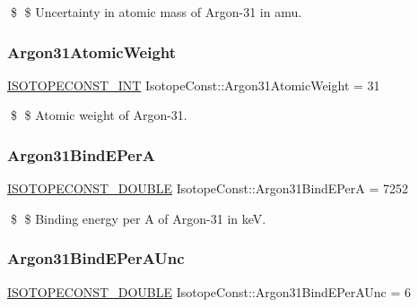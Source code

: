 \$ \$ Uncertainty in atomic mass of Argon-\/31 in amu. \mbox{\label{group___isotope_const-_argon-_ar31_gae4e7b91c923340f3e5c78f15bd593d5d}} 
\subsubsection{\texorpdfstring{Argon31\+Atomic\+Weight}{Argon31AtomicWeight}}
{\footnotesize\ttfamily \mbox{\hyperlink{group___isotope_const-_macros_ga5f18360b3e99483a35c32d789e62621c}{I\+S\+O\+T\+O\+P\+E\+C\+O\+N\+S\+T\+\_\+\+I\+NT}} Isotope\+Const\+::\+Argon31\+Atomic\+Weight = 31}

\$ \$ Atomic weight of Argon-\/31. \mbox{\label{group___isotope_const-_argon-_ar31_gaa3d40ea136ef40ffa4cb6e905960fc01}} 
\subsubsection{\texorpdfstring{Argon31\+Bind\+E\+PerA}{Argon31BindEPerA}}
{\footnotesize\ttfamily \mbox{\hyperlink{group___isotope_const-_macros_ga8f45a7272ce02c0b4c65c44636ed719a}{I\+S\+O\+T\+O\+P\+E\+C\+O\+N\+S\+T\+\_\+\+D\+O\+U\+B\+LE}} Isotope\+Const\+::\+Argon31\+Bind\+E\+PerA = 7252}

\$ \$ Binding energy per A of Argon-\/31 in keV. \mbox{\label{group___isotope_const-_argon-_ar31_gae4d8ebacb5c8867159b6baf88924d7e9}} 
\subsubsection{\texorpdfstring{Argon31\+Bind\+E\+Per\+A\+Unc}{Argon31BindEPerAUnc}}
{\footnotesize\ttfamily \mbox{\hyperlink{group___isotope_const-_macros_ga8f45a7272ce02c0b4c65c44636ed719a}{I\+S\+O\+T\+O\+P\+E\+C\+O\+N\+S\+T\+\_\+\+D\+O\+U\+B\+LE}} Isotope\+Const\+::\+Argon31\+Bind\+E\+Per\+A\+Unc = 6}

